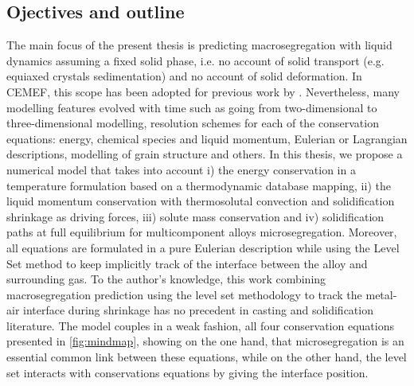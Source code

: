 \subsection{Ojectives and outline}
The main focus of the present thesis is predicting macrosegregation with liquid dynamics assuming a fixed solid phase, i.e. no account of solid 
transport (e.g. equiaxed crystals sedimentation) and no account of solid deformation. In CEMEF, this scope has been adopted for previous 
work by \citet{gouttebroze_modelisation_2005, liu_finite_2005, mosbah_multiple_2008, rivaux_simulation_2011, carozzani_developpement_2012}.
Nevertheless, many modelling features evolved with time such as going from two-dimensional to three-dimensional modelling, resolution schemes
for each of the conservation equations: energy, chemical species and liquid momentum, Eulerian or Lagrangian descriptions, 
modelling of grain structure and others. In this thesis, we propose a numerical model that takes into account 
i) the energy conservation in a temperature formulation based on a thermodynamic database mapping,
ii) the liquid momentum conservation with thermosolutal convection and solidification shrinkage as driving forces, 
iii) solute mass conservation and 
iv) solidification paths at full equilibrium for multicomponent alloys microsegregation. 
Moreover, all equations are formulated in a pure Eulerian description while using the Level Set method to keep 
implicitly track of the interface between the alloy and surrounding gas. To the author's knowledge, this work 
combining macrosegregation prediction using the level set methodology to track the metal-air interface during 
shrinkage has no precedent in casting and solidification literature. The model couples in a weak fashion, all four
conservation equations presented in \cref{fig:mindmap}, showing on the one hand, that microsegregation is an essential 
common link between these equations, while on the other hand, the level set interacts with conservations equations by
giving the interface position. 


